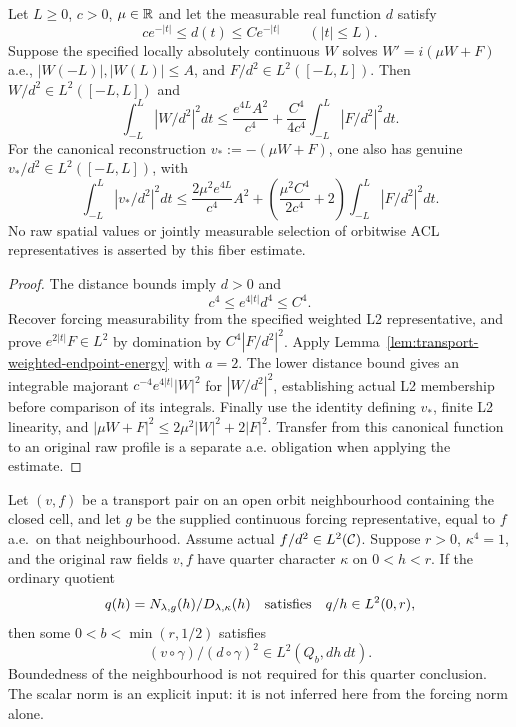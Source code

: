 \begin{lemma}
\label{lem:transport-saddle-endpoint-energy}
\leanok
Let $L\ge0$, $c>0$, $\mu\in\mathbb{R}$ and let the measurable real function $d$ satisfy
\[
 ce^{-|t|}\le d(t)\le Ce^{-|t|}\qquad (|t|\le L).
\]
Suppose the specified locally absolutely continuous $W$ solves
$W'=i(\mu W+F)$ a.e., $|W(-L)|,|W(L)|\le A$, and
$F/d^2\in L^2([-L,L])$.
Then $W/d^2\in L^2([-L,L])$ and
\[
 \int_{-L}^L |W/d^2|^2dt
 \le \frac{e^{4L}A^2}{c^4}
       +\frac{C^4}{4c^4}\int_{-L}^L |F/d^2|^2dt .
\]
For the canonical reconstruction $v_*:=-(\mu W+F)$, one also has genuine
$v_*/d^2\in L^2([-L,L])$, with
\[
 \int_{-L}^L |v_*/d^2|^2dt
 \le \frac{2\mu^2e^{4L}}{c^4}A^2+
       \left(\frac{\mu^2C^4}{2c^4}+2\right)
         \int_{-L}^L |F/d^2|^2dt .
\]
No raw spatial values or jointly measurable selection of orbitwise ACL
representatives is asserted by this fiber estimate.
\end{lemma}

\begin{proof}
\leanok
The distance bounds imply $d>0$ and
\[
 c^4\le e^{4|t|}d^4\le C^4.
\]
Recover forcing measurability from the specified weighted L2 representative,
and prove $e^{2|t|}F\in L^2$ by domination by $C^4|F/d^2|^2$.
Apply Lemma~\ref{lem:transport-weighted-endpoint-energy} with $a=2$.
The lower distance bound gives an integrable majorant
$c^{-4}e^{4|t|}|W|^2$ for $|W/d^2|^2$, establishing actual L2 membership
before comparison of its integrals.
Finally use the identity defining $v_*$, finite L2 linearity, and
$|\mu W+F|^2\le2\mu^2|W|^2+2|F|^2$.
Transfer from this canonical function to an original raw profile is a separate
a.e. obligation when applying the estimate.
\end{proof}

\begin{lemma}
\label{lem:weighted-quarter-mass}
\leanok
Let $(v,f)$ be a transport pair on an open orbit neighbourhood containing
the closed cell, and let $g$ be the supplied continuous forcing
representative, equal to $f$ a.e.\ on that neighbourhood.
Assume actual $f/d^2\in L^2(\mathcal{C})$.
Suppose $r>0$, $\kappa^4=1$, and the original raw fields $v,f$
have quarter character $\kappa$ on $0<h<r$.
If the ordinary quotient
\[
 q(h)=N_{\lambda,g}(h)/D_{\lambda,\kappa}(h)
 \quad\hbox{satisfies}\quad q/h\in L^2(0,r),
\]
then some $0<b<\min(r,1/2)$ satisfies
\[
 (v\circ\gamma)/ (d\circ\gamma)^2\in L^2(Q_b,dh\,dt).
\]
Boundedness of the neighbourhood is not required for this quarter conclusion.
The scalar norm is an explicit input: it is not inferred here from the
forcing norm alone.
\end{lemma}

